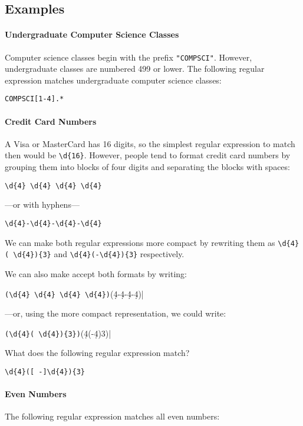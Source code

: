 \subsection{Examples}

\paragraph{Undergraduate Computer Science Classes} Computer science classes begin with the prefix \texttt{"COMPSCI"}. However, undergraduate classes are numbered 499 or lower. The following regular expression matches undergraduate computer science classes:

\texttt{COMPSCI[1-4].*}

\paragraph{Credit Card Numbers}
A Visa or MasterCard has 16 digits, so the simplest regular expression to match then would be \verb|\d{16}|. However, people tend to format credit card numbers by grouping them into blocks of four digits and separating the blocks with spaces:

\verb|\d{4} \d{4} \d{4} \d{4}|

---or with hyphens---

\verb|\d{4}-\d{4}-\d{4}-\d{4}|

We can make both regular expressions more compact by rewriting them as \verb|\d{4}( \d{4}){3}| and \verb|\d{4}(-\d{4}){3}| respectively.

We can also make accept both formats by writing:

\verb|(\d{4} \d{4} \d{4} \d{4})|(\d{4}-\d{4}-\d{4}-\d{4})|

---or, using the more compact representation, we could write:

\verb|(\d{4}( \d{4}){3})|(\d{4}(-\d{4}){3})|


\begin{think}

What does the following regular expression match?

\verb|\d{4}([ -]\d{4}){3}|
\end{think}

\paragraph{Even Numbers}

The following regular expression matches all even numbers:

